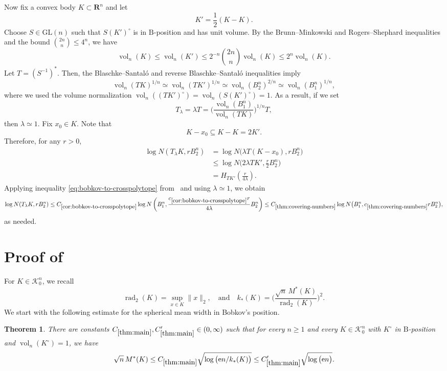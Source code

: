 \documentclass[11pt]{amsart}
\newcommand{\R}{\mathbf R}
\newcommand{\Vol}{\operatorname{vol}}
\newcommand{\rad}{\operatorname{rad}_2}
\newcommand{\DualDvoretzky}{k_\ast}
\newcommand{\GL}{\mathrm{GL}}
\newcommand{\1}{\mathbf 1}
\newcommand{\e}{\mathrm{e}}
\newcommand{\Bodies}{\mathcal{K}_0^n}
\newcommand{\Bobkov}{\mathrm{B}}
\let\vol\Vol
\theoremstyle{plain}
\newtheorem{theorem}{Theorem}[section]
\begin{document}
Now fix a convex body $K \subset \R^n$ and let
\[
K'=\frac12(K-K).
\]
Choose $S \in \GL(n)$ such that $S(K')^\circ$ is in $\Bobkov$-position and has unit volume.
By the Brunn--Minkowski and Rogers--Shephard
inequalities and the bound $\binom{2n}{n} \leq 4^n$, we have
\[
\vol_n(K)\leq \vol_n(K')
\leq 2^{-n}\binom{2n}{n}\vol_n(K)
\leq 2^n\vol_n(K).
\]
Let $T = (S^{-1})^\ast$. Then, the Blaschke--Santal\'{o} and reverse Blaschke--Santal\'{o} inequalities imply
\[
\vol_n(TK)^{1/n} \simeq 
\vol_n(TK')^{1/n} 
\simeq 
\vol_n(B^n_2)^{2/n} \simeq  \vol_n(B^n_1)^{1/n},
\]
where we used the volume normalization $\vol_n((TK')^\circ) = \vol_n(S (K')^\circ) =1$. As a result, if we set 
\[
T_\lambda = \lambda T = \Big (\frac{\vol_n(B_1^n)}{\vol_n(TK)}\Big)^{1/n} T, 
\]
then $\lambda \simeq 1$. 
Fix $x_0\in K$. Note that
\[
K-x_0\subseteq K-K=2K'.
\]
Therefore, for any $r>0$,
\begin{align*}
\log N(T_\lambda K,rB_2^n)
&=\log N\bigl(\lambda T(K-x_0),rB_2^n\bigr)\\
&\leq \log N\bigl(2\lambda TK',\tfrac r2B_2^n\bigr)\\
&=H_{TK'}\left(\frac{r}{4\lambda}\right).
\end{align*}
Applying inequality \eqref{eq:bobkov-to-crosspolytope} from~ and using $\lambda \simeq 1$, we obtain
\[
\log N(T_\lambda K,rB_2^n)
\leq
C_{\ref{cor:bobkov-to-crosspolytope}}\log N\left(
B_1^n,\frac{c_{\ref{cor:bobkov-to-crosspolytope}}r}{4\lambda}B_2^n
\right)
\leq
C_{\ref{thm:covering-numbers}}
\log N\big(
B_1^n,c_{\ref{thm:covering-numbers}}rB_2^n
\big),
\]
as needed.

\section{Proof of~\texorpdfstring{}{the reverse Urysohn theorem}}


For $K \in \Bodies$, we recall
\[
\rad(K) = \sup_{x \in K} \|x\|_2, \quad \text{and} \quad
\DualDvoretzky(K) = \bigg(\frac{\sqrt{n}\, M^\ast(K)}{\rad(K)}\bigg)^2.
\]
We start with the following estimate for the spherical mean width in Bobkov's position.

\begin{theorem}\label{thm:main}
There are constants $C_{\ref{thm:main}}, C_{\ref{thm:main}}' \in (0, \infty)$ such that for every $n\geq 1$
and every $K\in \Bodies$ with $K^\circ$ in $\Bobkov$-position and $\vol_n(K^\circ) = 1$,
we have
\begin{equation}\label{eq:main-bound}
\sqrt{n} \, M^\ast(K)
 \leq C_{\ref{thm:main}}\sqrt{\log\big(\e n/\DualDvoretzky(K)\big)} 
 \leq 
 C_{\ref{thm:main}}' \sqrt{\log\big(\e n\big)}.
\end{equation}
\end{theorem}
\end{document}

